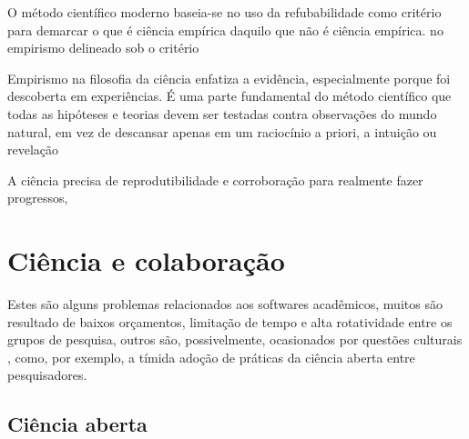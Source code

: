 

O método científico moderno baseia-se no uso da refubabilidade como critério para
demarcar o que é ciência empírica daquilo que não é ciência empírica.
no empirismo delineado sob o critério

Empirismo na filosofia da ciência enfatiza a evidência, especialmente porque
foi descoberta em experiências. É uma parte fundamental do método científico
que todas as hipóteses e teorias devem ser testadas contra observações do mundo
natural, em vez de descansar apenas em um raciocínio a priori, a intuição ou
revelação

A ciência precisa de reprodutibilidade e corroboração para realmente fazer
progressos,


\section{Ciência e colaboração}


Estes são alguns problemas relacionados aos softwares acadêmicos, muitos são
resultado de baixos orçamentos, limitação de tempo e alta rotatividade entre os
grupos de pesquisa, outros são, possivelmente, ocasionados por questões
culturais \cite{niemeyer2017open}, como, por exemplo, a tímida adoção de
práticas da ciência aberta entre pesquisadores.


\subsection{Ciência aberta}

